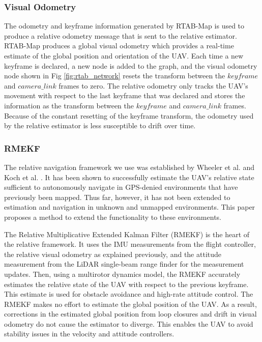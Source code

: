 \documentclass[letterpaper, 10 pt, conference]{ieeeconf}  %
\begin{document}
\subsubsection{Visual Odometry} \label{vis_odom}

The odometry and keyframe information generated by RTAB-Map is used to produce a relative odometry message that is sent to the relative estimator. RTAB-Map produces a global visual odometry which provides a real-time estimate of the global position and orientation of the UAV. Each time a new keyframe is declared, a new node is added to the graph, and the visual odometry node shown in Fig \ref{fig:rtab_network} resets the transform between the $\mathit{keyframe}$ and $\mathit{camera\_link}$ frames to zero. The relative odometry only tracks the UAV's movement with respect to the last keyframe that was declared and stores the information as the transform between the $\mathit{keyframe}$ and $\mathit{camera\_link}$ frames. Because of the constant resetting of the keyframe transform, the odometry used by the relative estimator is less susceptible to drift over time.

\subsubsection{RMEKF}

The relative navigation framework we use was established by Wheeler et al. \cite{Wheeler2017}\cite{Wheeler2018} and Koch et al. \cite{Koch2017}. It has been shown to successfully estimate the UAV's relative state sufficient to autonomously navigate in GPS-denied environments that have previously been mapped. Thus far, however, it has not been extended to estimation and navigation in unknown and unmapped environments. This paper proposes a method to extend the functionality to these environments.

The Relative Multiplicative Extended Kalman Filter (RMEKF) is the heart of the relative framework. It uses the IMU measurements from the flight controller, the relative visual odometry as explained previously, and the attitude measurement from the LiDAR single-beam range finder for the measurement updates. Then, using a multirotor dynamics model, the RMEKF accurately estimates the relative state of the UAV with respect to the previous keyframe. This estimate is used for obstacle avoidance and high-rate attitude control. The RMEKF makes no effort to estimate the global position of the UAV. As a result, corrections in the estimated global position from loop closures and drift in visual odometry do not cause the estimator to diverge. This enables the UAV to avoid stability issues in the velocity and attitude controllers.
\end{document}
